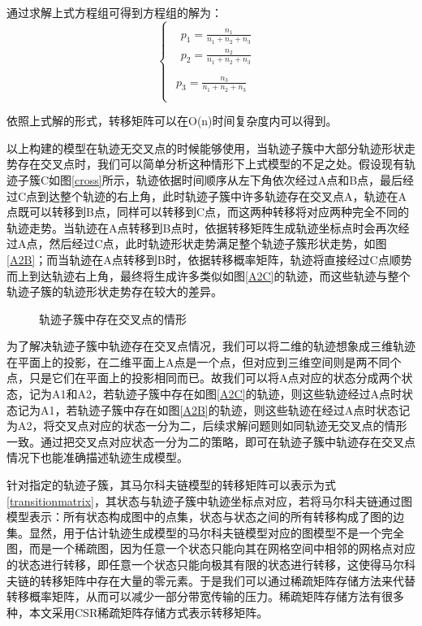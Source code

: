 通过求解上式方程组可得到方程组的解为：
\[
\begin{cases}
\begin{array}{c}
	\begin{array}{c}
	p_1=\frac{n_1}{n_1+n_2+n_3}\\
	p_2=\frac{n_2}{n_1+n_2+n_3}\\
\end{array}\\
	p_3=\frac{n_3}{n_1+n_2+n_3}\\
\end{array}    
\end{cases}
\]

依照上式解的形式，转移矩阵可以在O(n)时间复杂度内可以得到。

以上构建的模型在轨迹无交叉点的时候能够使用，当轨迹子簇中大部分轨迹形状走势存在交叉点时，我们可以简单分析这种情形下上式模型的不足之处。假设现有轨迹子簇C如图\ref{cross}所示，轨迹依据时间顺序从左下角依次经过A点和B点，最后经过C点到达整个轨迹的右上角，此时轨迹子簇中许多轨迹存在交叉点A，轨迹在A点既可以转移到B点，同样可以转移到C点，而这两种转移将对应两种完全不同的轨迹走势。当轨迹在A点转移到B点时，依据转移矩阵生成轨迹坐标点时会再次经过A点，然后经过C点，此时轨迹形状走势满足整个轨迹子簇形状走势，如图\ref{A2B}；而当轨迹在A点转移到B时，依据转移概率矩阵，轨迹将直接经过C点顺势而上到达轨迹右上角，最终将生成许多类似如图\ref{A2C}的轨迹，而这些轨迹与整个轨迹子簇的轨迹形状走势存在较大的差异。
\begin{figure}[H]
\caption{轨迹子簇中存在交叉点的情形}
\label{crosssituation}
\end{figure}

为了解决轨迹子簇中轨迹存在交叉点情况，我们可以将二维的轨迹想象成三维轨迹在平面上的投影，在二维平面上A点是一个点，但对应到三维空间则是两不同个点，只是它们在平面上的投影相同而已。故我们可以将A点对应的状态分成两个状态，记为A1和A2，若轨迹子簇中存在如图\ref{A2C}的轨迹，则这些轨迹经过A点时状态记为A1，若轨迹子簇中存在如图\ref{A2B}的轨迹，则这些轨迹在经过A点时状态记为A2，将交叉点对应的状态一分为二，后续求解问题则如同轨迹无交叉点的情形一致。通过把交叉点对应状态一分为二的策略，即可在轨迹子簇中轨迹存在交叉点情况下也能准确描述轨迹生成模型。

针对指定的轨迹子簇，其马尔科夫链模型的转移矩阵可以表示为式\ref{transitionmatrix}，其状态与轨迹子簇中轨迹坐标点对应，若将马尔科夫链通过图模型表示：所有状态构成图中的点集，状态与状态之间的所有转移构成了图的边集。显然，用于估计轨迹生成模型的马尔科夫链模型对应的图模型不是一个完全图，而是一个稀疏图，因为任意一个状态只能向其在网格空间中相邻的网格点对应的状态进行转移，即任意一个状态只能向极其有限的状态进行转移，这使得马尔科夫链的转移矩阵中存在大量的零元素。于是我们可以通过稀疏矩阵存储方法来代替转移概率矩阵，从而可以减少一部分带宽传输的压力。稀疏矩阵存储方法有很多种，本文采用CSR稀疏矩阵存储方式表示转移矩阵。


